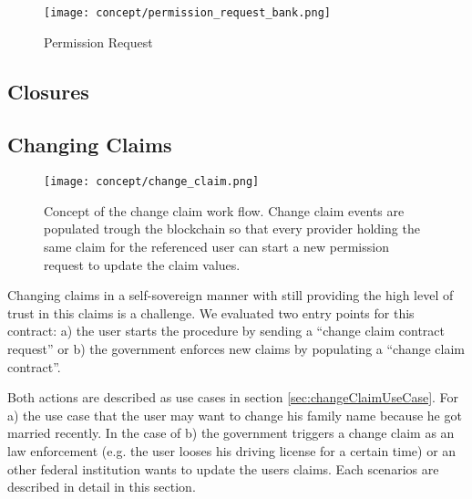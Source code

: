 \begin{figure}[ht]
\centering
\texttt{[image: concept/permission\_request\_bank.png]}
\caption{Permission Request}
\label{fig:permission_request}
\end{figure}

\subsection{Closures}
\begin{comment}
\begin{figure}[ht]
\centering
\texttt{[image: concept/closure.png]}
\caption{Closure}
\label{fig:closure}
\end{figure}
\end{comment}

\subsection{Changing Claims}

\begin{figure}
 \texttt{[image: concept/change\_claim.png]}
 \centering
\caption{Concept of the change claim work flow. Change claim events are populated trough the blockchain so that every provider holding the same claim for the referenced user can start a new permission request to update the claim values.}
\label{fig:changeClaimsFig}
\end{figure}

Changing claims in a self-sovereign manner with still providing the high level of trust in this claims is a challenge. We evaluated two entry points for this contract: a) the user starts the procedure by sending a “change claim contract request” or b) the government enforces new claims by populating a “change claim contract”. 

Both actions are described as use cases in section \ref{sec:changeClaimUseCase}. For a) the use case that the user may want to change his family name because he got married recently. In the case of b) the government triggers a change claim as an law enforcement (e.g. the user looses his driving license for a certain time) or an other federal institution wants to update the users claims. Each scenarios are described in detail in this section. 

